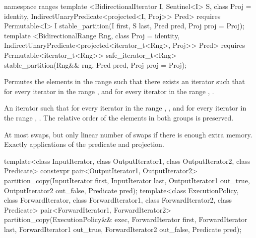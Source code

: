 \begin{addedblock}
%
\begin{itemdecl}
namespace ranges {
  template <BidirectionalIterator I, Sentinel<I> S, class Proj = identity,
            IndirectUnaryPredicate<projected<I, Proj>> Pred>
      requires Permutable<I>
    I stable_partition(I first, S last, Pred pred, Proj proj = Proj{});
  template <BidirectionalRange Rng, class Proj = identity,
            IndirectUnaryPredicate<projected<iterator_t<Rng>, Proj>> Pred>
      requires Permutable<iterator_t<Rng>>
    safe_iterator_t<Rng> stable_partition(Rng&& rng, Pred pred, Proj proj = Proj{});
}
\end{itemdecl}

\begin{itemdescr}
\pnum
\effects Permutes the elements in the range  such that there exists an iterator 
such that for every iterator  in the range 
, and for every iterator  in the
range , .

\pnum
\returns
An iterator
such that for every iterator
in the range
,
,
and for every iterator
in the range
,
.
The relative order of the elements in both groups is preserved.

\pnum
\complexity
At most
swaps, but only linear number of swaps if there is enough extra memory.
Exactly
applications of the predicate and projection.
\end{itemdescr}
\end{addedblock}

%
\begin{itemdecl}
template<class InputIterator, class OutputIterator1,
         class OutputIterator2, class Predicate>
  constexpr pair<OutputIterator1, OutputIterator2>
    partition_copy(InputIterator first, InputIterator last,
                   OutputIterator1 out_true, OutputIterator2 out_false, Predicate pred);
template<class ExecutionPolicy, class ForwardIterator, class ForwardIterator1,
         class ForwardIterator2, class Predicate>
  pair<ForwardIterator1, ForwardIterator2>
    partition_copy(ExecutionPolicy&& exec,
                   ForwardIterator first, ForwardIterator last,
                   ForwardIterator1 out_true, ForwardIterator2 out_false, Predicate pred);
\end{itemdecl}

